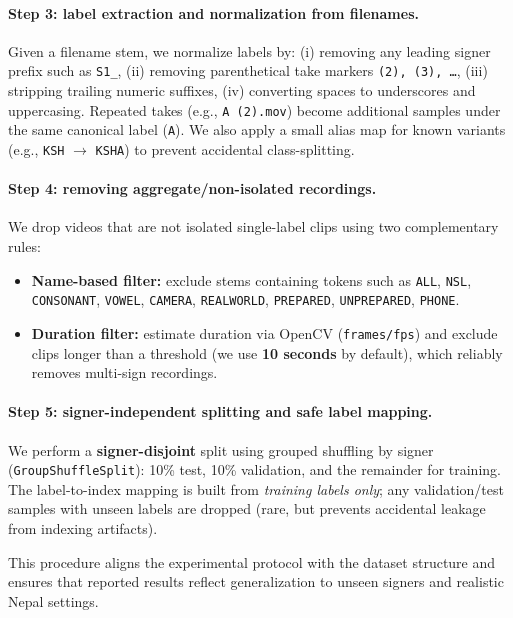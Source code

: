 \documentclass[conference]{IEEEtran}
\begin{document}
\paragraph{Step 3: label extraction and normalization from filenames.}
Given a filename stem, we normalize labels by:
(i) removing any leading signer prefix such as \texttt{S1\_},
(ii) removing parenthetical take markers \texttt{(2), (3), \ldots},
(iii) stripping trailing numeric suffixes,
(iv) converting spaces to underscores and uppercasing.
Repeated takes (e.g., \texttt{A (2).mov}) become additional samples under the same canonical label (\texttt{A}). We also apply a small alias map for known variants (e.g., \texttt{KSH} $\rightarrow$ \texttt{KSHA}) to prevent accidental class-splitting.

\paragraph{Step 4: removing aggregate/non-isolated recordings.}
We drop videos that are not isolated single-label clips using two complementary rules:
\begin{itemize}
  \item \textbf{Name-based filter:} exclude stems containing tokens such as \texttt{ALL}, \texttt{NSL}, \texttt{CONSONANT}, \texttt{VOWEL}, \texttt{CAMERA}, \texttt{REALWORLD}, \texttt{PREPARED}, \texttt{UNPREPARED}, \texttt{PHONE}.
  \item \textbf{Duration filter:} estimate duration via OpenCV (\texttt{frames/fps}) and exclude clips longer than a threshold (we use \textbf{10 seconds} by default), which reliably removes multi-sign recordings.
\end{itemize}

\paragraph{Step 5: signer-independent splitting and safe label mapping.}
We perform a \textbf{signer-disjoint} split using grouped shuffling by signer (\texttt{GroupShuffleSplit}): 10\% test, 10\% validation, and the remainder for training. The label-to-index mapping is built from \emph{training labels only}; any validation/test samples with unseen labels are dropped (rare, but prevents accidental leakage from indexing artifacts).

This procedure aligns the experimental protocol with the dataset structure and ensures that reported results reflect generalization to unseen signers and realistic Nepal settings.
\end{document}
